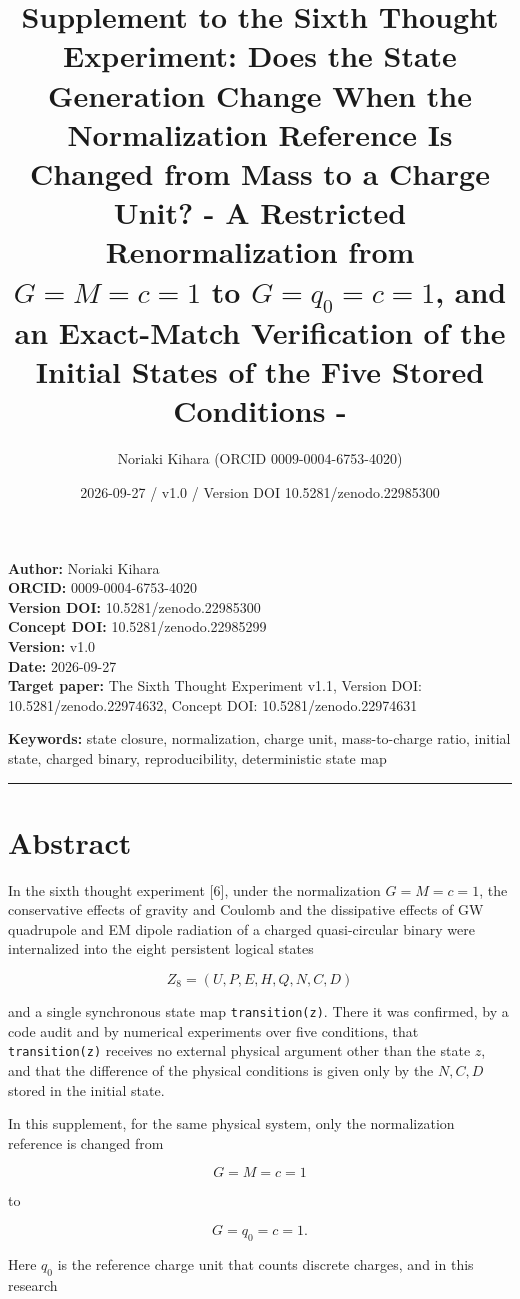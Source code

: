 \documentclass[
  a4paper,
]{article}
\title{Supplement to the Sixth Thought Experiment: Does the State
Generation Change When the Normalization Reference Is Changed from Mass
to a Charge Unit? - A Restricted Renormalization from \(G=M=c=1\) to
\(G=q_0=c=1\), and an Exact-Match Verification of the Initial States of
the Five Stored Conditions -}
\author{Noriaki Kihara (ORCID 0009-0004-6753-4020)}
\date{2026-09-27 / v1.0 / Version DOI 10.5281/zenodo.22985300}
\begin{document}
\maketitle

\textbf{Author:} Noriaki Kihara\\
\textbf{ORCID:} 0009-0004-6753-4020\\
\textbf{Version DOI:} 10.5281/zenodo.22985300\\
\textbf{Concept DOI:} 10.5281/zenodo.22985299\\
\textbf{Version:} v1.0\\
\textbf{Date:} 2026-09-27\\
\textbf{Target paper:} The Sixth Thought Experiment v1.1, Version DOI:
10.5281/zenodo.22974632, Concept DOI: 10.5281/zenodo.22974631

\textbf{Keywords:} state closure, normalization, charge unit,
mass-to-charge ratio, initial state, charged binary, reproducibility,
deterministic state map

\begin{center}\rule{0.5\linewidth}{0.5pt}\end{center}

\section{Abstract}\label{abstract}

In the sixth thought experiment {[}6{]}, under the normalization
\(G=M=c=1\), the conservative effects of gravity and Coulomb and the
dissipative effects of GW quadrupole and EM dipole radiation of a
charged quasi-circular binary were internalized into the eight
persistent logical states

\[
Z_8=(U,P,E,H,Q,N,C,D)
\]

and a single synchronous state map \texttt{transition(z)}. There it was
confirmed, by a code audit and by numerical experiments over five
conditions, that \texttt{transition(z)} receives no external physical
argument other than the state \(z\), and that the difference of the
physical conditions is given only by the \(N,C,D\) stored in the initial
state.

In this supplement, for the same physical system, only the normalization
reference is changed from

\[
G=M=c=1
\]

to

\[
\boxed{G=q_0=c=1}.
\]

Here \(q_0\) is the reference charge unit that counts discrete charges,
and in this research
\end{document}
